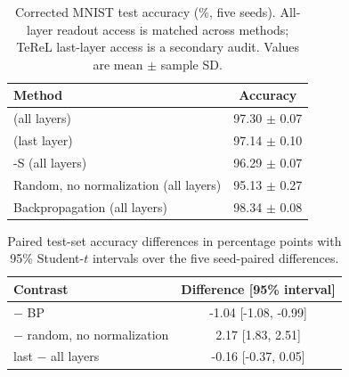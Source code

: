 \begin{table}[t]
\centering
\caption{Corrected MNIST test accuracy (\%, five seeds). All-layer readout access is matched across methods; TeReL last-layer access is a secondary audit. Values are mean $\pm$ sample SD.}
\label{tab:corrected-mnist}
\begin{tabular}{lc}
\toprule
Method & Accuracy \\
\midrule
\TeReL{} (all layers) & 97.30 $\pm$ 0.07 \\
\TeReL{} (last layer) & 97.14 $\pm$ 0.10 \\
\TeReL{}-S (all layers) & 96.29 $\pm$ 0.07 \\
Random, no normalization (all layers) & 95.13 $\pm$ 0.27 \\
Backpropagation (all layers) & 98.34 $\pm$ 0.08 \\
\bottomrule
\end{tabular}
\end{table}

\begin{table}[t]
\centering
\caption{Paired test-set accuracy differences in percentage points with 95\% Student-$t$ intervals over the five seed-paired differences.}
\label{tab:corrected-contrasts}
\begin{tabular}{lc}
\toprule
Contrast & Difference [95\% interval] \\
\midrule
\TeReL{} $-$ BP & -1.04 [-1.08, -0.99] \\
\TeReL{} $-$ random, no normalization & 2.17 [1.83, 2.51] \\
last $-$ all layers & -0.16 [-0.37, 0.05] \\
\bottomrule
\end{tabular}
\end{table}
